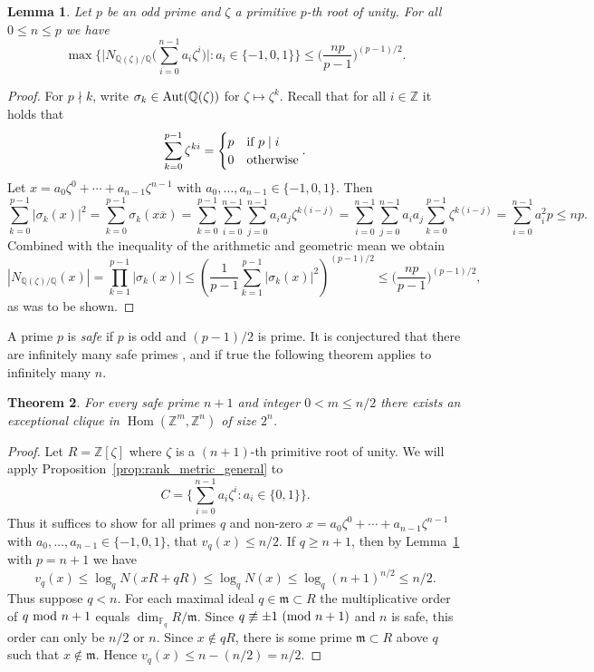 \documentclass{amsart}
\theoremstyle{plain}
\newtheorem{theorem}{Theorem}[section]
\newtheorem{lemma}[theorem]{Lemma}
\theoremstyle{definition}
\DeclareMathOperator{\Hom}{Hom}
\newcommand{\Z}{\ensuremath{\mathbb{Z}}}
\newcommand{\Q}{\ensuremath{\mathbb{Q}}}
\newcommand{\F}{\ensuremath{\mathbb{F}}}
\newcommand{\m}{\ensuremath{\mathfrak{m}}}
\newcommand{\clq}{C}
\begin{document}
\begin{lemma}\label{lem:norm_bound}
	Let \(p\) be an odd prime and \(\zeta\) a primitive \(p\)-th root of unity. For all \(0 \leq n \leq p\) we have
	\[\max\Big\{ \Big|N_{\Q(\zeta)/\Q}\Big( \sum_{i=0}^{n-1} a_i\zeta^i \Big)\Big| : a_i\in\{-1,0,1\} \Big\} \leq \Big(\frac{np}{p-1}\Big)^{(p-1)/2}. \]
\end{lemma}
\begin{proof}
	For \(p\nmid k\), write \(\sigma_k\in\textup{Aut}(\Q(\zeta))\) for \(\zeta\mapsto \zeta^k\).
	Recall that for all \(i\in\Z\) it holds that
	\[ \sum_{k=0}^{p-1} \zeta^{ki} = \begin{cases} p & \textup{if } p \mid i  \\ 0 & \textup{otherwise} \end{cases}. \]
	Let \(x=a_0\zeta^0+\dotsm+a_{n-1}\zeta^{n-1}\) with \(a_0,\dotsc,a_{n-1}\in\{-1,0,1\}\).
	Then
	\[ \sum_{k=0}^{p-1} |\sigma_k(x)|^2 = \sum_{k=0}^{p-1} \sigma_k(x\overline{x}) = \sum_{k=0}^{p-1} \sum_{i=0}^{n-1}\sum_{j=0}^{n-1}  a_i a_j \zeta^{k(i-j)} = \sum_{i=0}^{n-1}\sum_{j=0}^{n-1} a_i a_j \sum_{k=0}^{p-1} \zeta^{k(i-j)} = \sum_{i=0}^{n-1} a_i^2 p \leq np.\]
	Combined with the inequality of the arithmetic and geometric mean we obtain
	\[ |N_{\Q(\zeta)/\Q}(x)| = \prod_{k=1}^{p-1} |\sigma_k(x)| \leq \left(\frac{1}{p-1}\sum_{k=1}^{p-1} |\sigma_k(x)|^2 \right)^{(p-1)/2} \leq \Big(\frac{np}{p-1}\Big)^{(p-1)/2},\]
	as was to be shown.
\end{proof}

A prime \(p\) is \emph{safe} if \(p\) is odd and \((p-1)/2\) is prime. It is conjectured that there are infinitely many safe primes \cite{Shoup}, and if true the following theorem applies to infinitely many \(n\).

\begin{theorem}\label{thm:rank-metric}
	For every safe prime \(n+1\) and integer \(0<m\leq n/2\) there exists an exceptional clique in \(\Hom(\Z^m,\Z^n)\) of size \(2^n\).
\end{theorem}
\begin{proof}
	Let \(R=\Z[\zeta]\) where \(\zeta\) is a \((n+1)\)-th primitive root of unity. 
	We will apply Proposition~\ref{prop:rank_metric_general} to 
	\[ \clq=\Big\{ \sum_{i=0}^{n-1} a_i \zeta^i : a_i\in\{0,1\} \Big\}. \]
	Thus it suffices to show for all primes \(q\) and non-zero \(x=a_0\zeta^0+\dotsm+a_{n-1}\zeta^{n-1}\) with \(a_0,\dotsc,a_{n-1}\in\{-1,0,1\}\), that \(v_q(x)\leq n/2\).
	If \(q\geq n+1\), then by Lemma~\ref{lem:norm_bound} with \(p=n+1\) we have 
	\[v_q(x)\leq \log_q N(xR+qR)\leq \log_q N(x)\leq \log_q (n+1)^{n/2}\leq n/2.\]
	Thus suppose \(q<n\). For each maximal ideal \(q\in \m\subset R\) the multiplicative order of \(q\textup{ mod }n+1\) equals \(\dim_{\F_q} R/\m\). Since \(q\not\equiv \pm 1\ (\textup{mod }n+1)\) and \(n\) is safe, this order can only be \(n/2\) or \(n\).
	Since \(x\not\in qR\), there is some prime \(\m\subset R\) above \(q\) such that \(x\not\in\m\).
	Hence \(v_q(x)\leq n-(n/2) = n/2\).
\end{proof}
\end{document}
